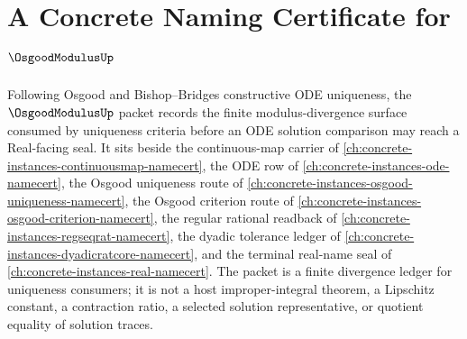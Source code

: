 \chapter{A Concrete Naming Certificate for $\OsgoodModulusUp$}
\label{ch:concrete-instances-osgood-modulus-namecert}

Following Osgood and Bishop--Bridges constructive ODE uniqueness, the $\OsgoodModulusUp$ packet records the finite modulus-divergence surface consumed by uniqueness criteria before an ODE solution comparison may reach a Real-facing seal. It sits beside the continuous-map carrier of \autoref{ch:concrete-instances-continuousmap-namecert}, the ODE row of \autoref{ch:concrete-instances-ode-namecert}, the Osgood uniqueness route of \autoref{ch:concrete-instances-osgood-uniqueness-namecert}, the Osgood criterion route of \autoref{ch:concrete-instances-osgood-criterion-namecert}, the regular rational readback of \autoref{ch:concrete-instances-regseqrat-namecert}, the dyadic tolerance ledger of \autoref{ch:concrete-instances-dyadicratcore-namecert}, and the terminal real-name seal of \autoref{ch:concrete-instances-real-namecert}. The packet is a finite divergence ledger for uniqueness consumers; it is not a host improper-integral theorem, a Lipschitz constant, a contraction ratio, a selected solution representative, or quotient equality of solution traces.

